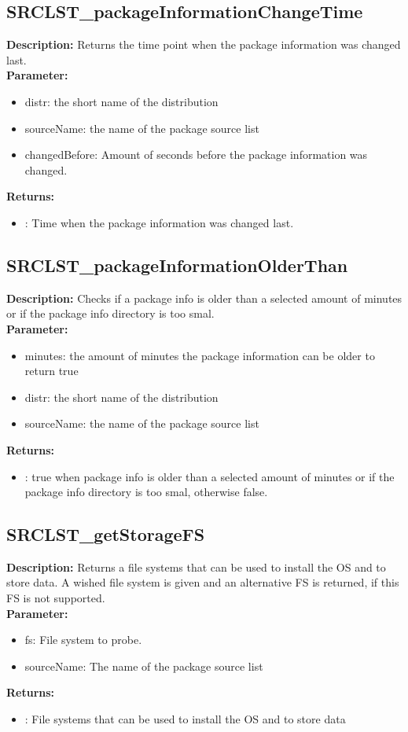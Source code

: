 \subsection{SRCLST\_packageInformationChangeTime}
\textbf{Description:} Returns the time point when the package information was changed last.\\
\textbf{Parameter:}
\begin{itemize}
\item distr: the short name of the distribution
\item sourceName: the name of the package source list
\item changedBefore: Amount of seconds before the package information was changed.
\end{itemize}
\textbf{Returns:}
\begin{itemize}
\item : Time when the package information was changed last.
\end{itemize}

\subsection{SRCLST\_packageInformationOlderThan}
\textbf{Description:} Checks if a package info is older than a selected amount of minutes or if the package info directory is too smal.\\
\textbf{Parameter:}
\begin{itemize}
\item minutes: the amount of minutes the package information can be older to return true
\item distr: the short name of the distribution
\item sourceName: the name of the package source list
\end{itemize}
\textbf{Returns:}
\begin{itemize}
\item : true when package info is older than a selected amount of minutes or if the package info directory is too smal, otherwise false.
\end{itemize}

\subsection{SRCLST\_getStorageFS}
\textbf{Description:} Returns a file systems that can be used to install the OS and to store data. A wished file system is given and an alternative FS is returned, if this FS is not supported.\\
\textbf{Parameter:}
\begin{itemize}
\item fs: File system to probe.
\item sourceName: The name of the package source list
\end{itemize}
\textbf{Returns:}
\begin{itemize}
\item : File systems that can be used to install the OS and to store data
\end{itemize}

